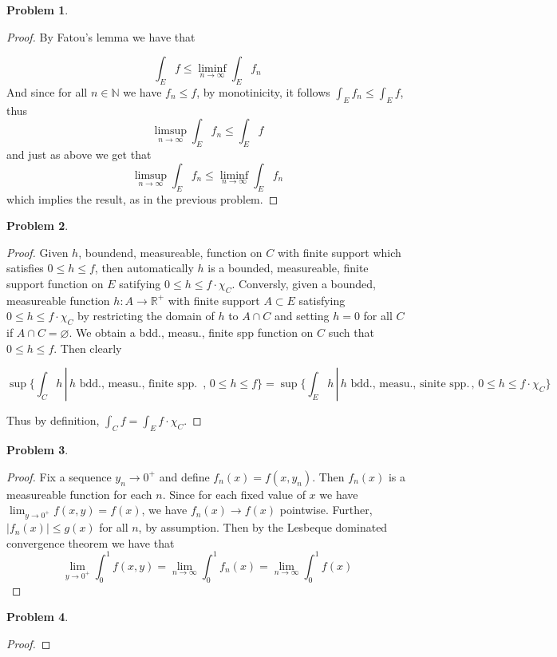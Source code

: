 \documentclass{article}
\newcommand{\R}{\mathbb{R}}
\newcommand{\N}{\mathbb{N}}
\newtheorem{prb}{Problem}
\begin{document}
	    \begin{prb}  \end{prb} 
	    \begin{proof} 
	  By Fatou's lemma we have that 
	  
	\[ \int_E f \leq \liminf_{n \to \infty} \int_E f_n \] 
	And since for all $n \in \N$ we have $f_n \leq f$, by monotinicity, it follows 
	$\int_E f_n \leq \int_E f$, thus 
	\[ \limsup_{n \to \infty} \int_E f_n \leq \int_E f \] 
	and just as above we get that  
	\[ \limsup_{n \to \infty} \int_E f_n \leq \liminf_{n \to \infty} \int_E f_n \] 
	which implies the result, as in the previous problem.  
\end{proof} 

\begin{prb}  \end{prb} 
\begin{proof} 
	Given $h$, boundend, measureable, function on $C$ with finite support which satisfies $0 \leq h \leq f$, then 
	automatically $h$ is a bounded, measureable, finite support function on $E$ satifying $0 \leq h \leq f \cdot \chi_C$. 
	Conversly, given a bounded, measureable function $h:A \to \R^+$ with finite support $A \subset E$ satisfying $0 \leq h \leq f \cdot \chi_C$ by restricting the domain of $h$ to $A \cap C$ and setting $h = 0$ for all $C$ if $A \cap C = \varnothing$. We obtain a bdd., measu., finite spp function on $C$ such that $0 \leq h \leq f$.  Then clearly 

	\[ \sup \{ \int_C h\, | \, h \text{ bdd., measu., finite spp. } \, , \, 0 \leq h \leq f \} 
	= \sup \{ \int_E h \, | \, h \text{ bdd., measu., sinite spp.} \, , \, 0 \leq h \leq f\cdot \chi_C \} \]

Thus by definition, $\int_C f = \int_E f \cdot \chi_C $. 
\end{proof} 


\begin{prb}  \end{prb} 
\begin{proof} 
	Fix a sequence $y_n \to 0^+$ and define $f_n(x) = f(x, y_n)$. 
	Then $f_n(x)$ is a measureable function for each $n$. Since for each fixed value of $x$ we have 
	$\lim_{y \to 0^+} f(x, y)= f(x)$, we have $f_n(x) \to f(x)$ pointwise. 
	Further, $|f_n(x)| \leq g(x)$ for all $n$, by assumption. Then by the Lesbeque dominated convergence theorem we have that 
	\[ \lim_{y \to 0^+} \int_0^1 f(x, y)  = \lim_{n \to \infty} \int_0^1 f_n(x) = \lim_{n \to \infty} \int_0^1 f(x) \] 
\end{proof} 

\begin{prb}  \end{prb} 
\begin{proof} 
 	
\end{proof} 
\end{document}
